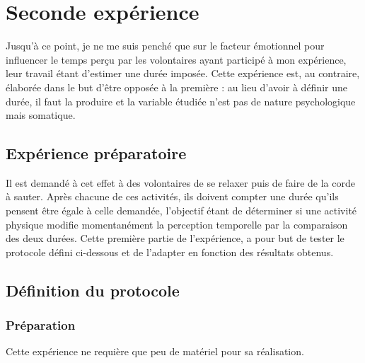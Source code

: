 \documentclass[12pt,fleqn,oneside,openany]{book} %
\begin{document}
\newpage
\section{Seconde expérience} \label{sec:exp2}
Jusqu'à ce point, je ne me suis penché que sur le facteur émotionnel pour influencer le temps perçu par les volontaires ayant participé à mon expérience, leur travail étant d'estimer une durée imposée. Cette expérience est, au contraire, élaborée dans le but d'être opposée à la première : au lieu d'avoir à définir une durée, il faut la produire et la variable étudiée n'est pas de nature psychologique mais somatique.
\subsection{Expérience préparatoire} \label{ssec:but2.1}
Il est demandé à cet effet à des volontaires de se relaxer puis de faire de la corde à sauter. Après chacune de ces activités, ils doivent compter une durée qu'ils pensent être égale à celle demandée, l'objectif étant de déterminer si une activité physique modifie momentanément la perception temporelle par la comparaison des deux durées. Cette première partie de l'expérience, a pour but de tester le protocole défini ci-dessous et de l'adapter en fonction des résultats obtenus.

\subsection{Définition du protocole} \label{ssec:defProto2.1}

\subsubsection{Préparation} \label{sssec:preparation2.1}
Cette expérience ne requière que peu de matériel pour sa réalisation.
\end{document}
